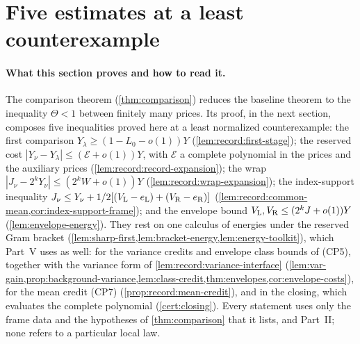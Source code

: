 \makeatletter
\providecommand{\setprimedlabel}[1]{\protected@edef\@currentlabel{#1}}
\makeatother
\section{Five estimates at a least counterexample}
\label{sec:comparison-lemmas}

\paragraph{What this section proves and how to read it.}
The comparison theorem (\cref{thm:comparison}) reduces the baseline theorem to the
inequality $\Theta<1$ between finitely many prices. Its proof, in the next
section, composes five inequalities proved here at a least normalized
counterexample: the first comparison $Y_\lambda\ge(1-L_0-o(1))Y$
(\cref{lem:record:first-stage}); the reserved cost
$|Y_\nu-Y_\lambda|\le(\mathcal E+o(1))Y$, with $\mathcal E$ a complete
polynomial in the prices and the auxiliary prices
(\cref{lem:record:record-expansion}); the wrap
$|J_\nu-2^kY_\nu|\le(2^kW+o(1))Y$ (\cref{lem:record:wrap-expansion}); the
index-support inequality
$J_\nu\le Y_\nu+\frac12[(V_{\rm L}-e_{\rm L})+(V_{\rm R}-e_{\rm R})]$
(\cref{lem:record:common-mean,cor:index-support-frame}); and the envelope
bound $V_{\rm L},V_{\rm R}\le(2^kJ+o(1))Y$ (\cref{lem:envelope-energy}). They
rest on one calculus of energies under the reserved Gram bracket
(\cref{lem:sharp-first,lem:bracket-energy,lem:energy-toolkit}), which Part~V
uses as well: for the variance credits and envelope class bounds of (CP5),
together with the variance form of \cref{lem:record:variance-interface}
(\cref{lem:var-gain,prop:background-variance,lem:class-credit,thm:envelopes,cor:envelope-costs}),
for the mean credit (CP7) (\cref{prop:record:mean-credit}), and in the
closing, which evaluates the complete polynomial (\cref{cert:closing}). Every
statement uses only the frame data and the hypotheses of
\cref{thm:comparison} that it lists, and Part~II; none refers to a particular
local law.

